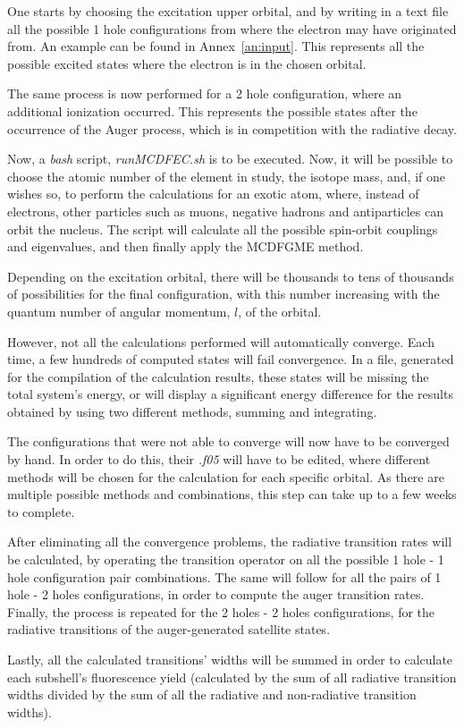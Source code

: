  One starts by choosing the excitation upper orbital, and by  writing in a text file all the possible 1 hole configurations from where the electron may have originated from. An example can be found in Annex~\ref{an:input}. This represents all the possible excited states where the electron is in the chosen orbital.
 
 The same process is now performed for a 2 hole configuration, where an additional ionization occurred. This represents the possible states after the occurrence of the Auger process, which is in competition with the radiative decay.

 Now, a \textit{bash} script, \textit{runMCDFEC.sh} is to be executed. Now, it will be possible to choose the atomic number of the element in study, the isotope mass, and, if one wishes so, to perform the calculations for an exotic atom, where, instead of electrons, other particles such as muons, negative hadrons and antiparticles can orbit the nucleus. 
 The script will calculate all the possible spin-orbit couplings and eigenvalues, and then finally apply the \gls{MCDFGME} method.

 Depending on the excitation orbital, there will be thousands to tens of thousands of possibilities for the final configuration, with this number increasing with the quantum number of angular momentum, $l$, of the orbital.
 
 However, not all the calculations performed will automatically converge. Each time, a few hundreds of computed states will fail convergence. In a file, generated for the compilation of the calculation results, these states will be missing the total system's energy, or will display a significant energy difference for the results obtained by using two different methods, summing and integrating.

 The configurations that were not able to converge will now have to be converged by hand. In order to do this, their \textit{.f05} will have to be edited, where different methods will be chosen for the calculation for each specific orbital. As there are multiple possible methods and combinations, this step can take up to a few weeks to complete.

 After eliminating all the convergence problems, the radiative transition rates will be calculated, by operating the transition operator on all the possible 1 hole - 1 hole configuration pair combinations. The same will follow for all the pairs of 1 hole - 2 holes configurations, in order to compute the auger transition rates. Finally, the process is repeated for the 2 holes - 2 holes configurations, for the radiative transitions of the auger-generated satellite states.


 Lastly, all the calculated transitions' widths will be summed in order to calculate each subshell's fluorescence yield (calculated by the sum of all radiative transition widths divided by the sum of all the radiative and non-radiative transition widths).

